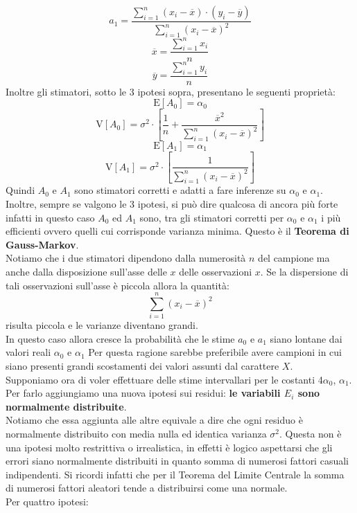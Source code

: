\documentclass[a4paper,12pt, oneside]{book}
\begin{document}
\[a_{1}=\frac{\sum_{i=1}^{n}\left(x_{i}-\overline{x}\right) \cdot\left(y_{i}-\overline{y}\right)}{\sum_{i=1}^{n}\left(x_{i}-\overline{x}\right)^{2}}\]
\[\overline{x}=\frac{\sum_{i=1}^{n} x_{i}}{n}\]
\[\overline{y}=\frac{\sum_{i=1}^{n} y_{i}}{n}\]
Inoltre gli stimatori, sotto le 3 ipotesi sopra, presentano le seguenti proprietà:
\[\mathrm{E}\left[A_{0}\right]=\alpha_{0}\]
\[\mathrm{V}\left[A_{0}\right]=\sigma^{2} \cdot\left[\frac{1}{n}+\frac{\overline{x}^{2}}{\sum_{i=1}^{n}\left(x_{i}-\overline{x}\right)^{2}}\right]\]
\[\mathrm{E}\left[A_{1}\right]=\alpha_{1}\]
\[\mathrm{V}\left[A_{1}\right]=\sigma^{2} \cdot\left[\frac{1}{\sum_{i=1}^{n}\left(x_{i}-\overline{x}\right)^{2}}\right]\]
Quindi $A_0$ e $A_1$ sono stimatori corretti e adatti a fare inferenze su $\alpha_0$ e $\alpha_1$.\\
Inoltre, sempre se valgono le 3 ipotesi, si può dire qualcosa di ancora più forte infatti in questo caso $A_0$ ed $A_1$ sono, tra gli
stimatori corretti per $\alpha_0$ e $\alpha_1$
i più efficienti ovvero quelli cui corrisponde varianza minima. Questo è il \textbf{Teorema di Gauss-Markov}.\\
Notiamo che i due stimatori dipendono dalla numerosità $n$ del campione ma anche dalla disposizione sull'asse delle $x$ delle osservazioni $x$. Se la dispersione di tali osservazioni sull'asse è piccola allora la quantità:
\[\sum_{i=1}^{n}\left(x_{i}-\overline{x}\right)^{2}\]
risulta piccola e le varianze diventano grandi.\\
In questo caso allora cresce la probabilità che le stime
$a_0$ e $a_1$ siano lontane dai valori reali $\alpha_0$ e $\alpha_1$
Per questa ragione sarebbe preferibile avere campioni in cui siano presenti grandi scostamenti
dei valori assunti dal carattere $X$.\\
Supponiamo ora di voler effettuare delle stime intervallari per le costanti 4$\alpha_0$, $\alpha_1$. Per farlo aggiungiamo una nuova ipotesi sui residui:
\textbf{le variabili $E_i$ sono normalmente distribuite}.\\
Notiamo che essa aggiunta alle altre equivale a dire che ogni residuo è normalmente
distribuito con media nulla ed identica varianza $\sigma^2$.
Questa non è una ipotesi molto restrittiva o irrealistica, in effetti è logico aspettarsi
che gli errori siano normalmente distribuiti in quanto somma di numerosi fattori
casuali indipendenti.
Si ricordi infatti che per il Teorema del Limite Centrale la somma di numerosi fattori
aleatori tende a distribuirsi come una normale.\\Per quattro ipotesi:
\end{document}
